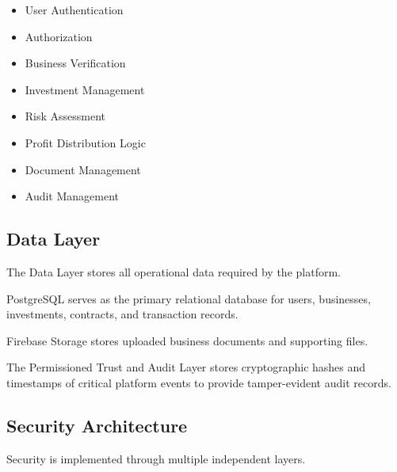 \begin{itemize}

\item User Authentication

\item Authorization

\item Business Verification

\item Investment Management

\item Risk Assessment

\item Profit Distribution Logic

\item Document Management

\item Audit Management

\end{itemize}


\subsection{Data Layer}

The Data Layer stores all operational data required by the platform.

PostgreSQL serves as the primary relational database for users, businesses, investments, contracts, and transaction records.

Firebase Storage stores uploaded business documents and supporting files.

The Permissioned Trust and Audit Layer stores cryptographic hashes and timestamps of critical platform events to provide tamper-evident audit records.


\subsection{Security Architecture}

Security is implemented through multiple independent layers.

